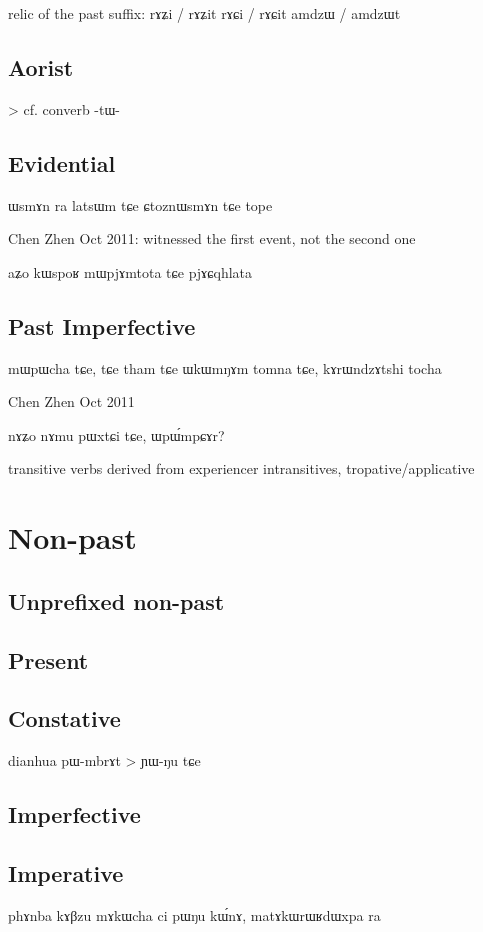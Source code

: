 \documentclass[oldfontcommands,oneside,a4paper,11pt]{memoir}
\newcommand{\wav}[1]{}%
\begin{document}
relic of the past suffix:
rɤʑi / rɤʑit
rɤɕi / rɤɕit
amdzɯ / amdzɯt
\subsection{Aorist} \label{sub:aor}

> cf. converb -tɯ-
\subsection{Evidential} \label{sub:evd}
ɯsmɤn ra latsɯm tɕe ɕtoznɯsmɤn tɕe tope
\wav{8_znWsmAn}
Chen Zhen Oct 2011: witnessed the first event, not the second one

aʑo kɯspoʁ mɯpjɤmtota tɕe pjɤɕqhlata

\subsection{Past Imperfective} \label{sub:pst.ipf}

mɯpɯcha tɕe, tɕe tham tɕe ɯkɯmŋɤm tomna tɕe, kɤrɯndzɤtshi tocha
\wav{8_tocha}
Chen Zhen Oct 2011

nɤʑo nɤmu pɯxtɕi tɕe, ɯpɯ́mpɕɤr?

transitive verbs derived from experiencer intransitives, tropative/applicative
\section{Non-past}
\subsection{Unprefixed non-past}
\subsection{Present}
\subsection{Constative}



dianhua pɯ-mbrɤt > ɲɯ-ŋu tɕe
\subsection{Imperfective}

\subsection{Imperative}
phɤnba kɤβzu mɤkɯcha ci pɯŋu kɯ́nɤ, matɤkɯrɯʁdɯxpa ra
\end{document}
